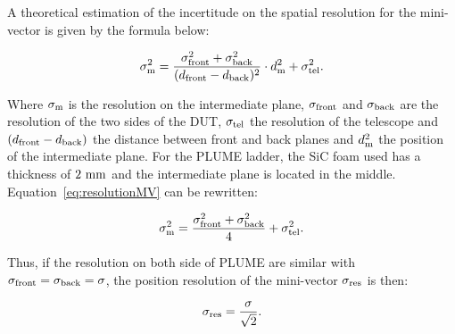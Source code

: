     A theoretical estimation of the incertitude on the spatial resolution for the mini-vector is given by the formula below:

    \begin{equation}
      \sigma_{\rm{m}}^2 = \frac{\sigma_{\rm{front}}^2 + \sigma_{\rm{back}}^2}{(d_{\rm{front}} - d_{\rm{back}})^2} \cdot d_{\rm{m}}^2 + \sigma_{\rm{tel}}^2.
      \label{eq:resolutionMV}
    \end{equation}

    Where $\sigma_{\rm{m}}$ is the resolution on the intermediate plane, $\sigma_{\rm{front}}$ and $\sigma_{\rm{back}}$ are the resolution of the two sides of the \gls{DUT}, $\sigma_{\rm{tel}}$ the resolution of the telescope and $(d_{\rm{front}} - d_{\rm{back}})$ the distance between front and back planes and $d_{\rm{m}}^2$ the position of the intermediate plane.
    For the \gls{PLUME} ladder, the \gls{SiC} foam used has a thickness of $2~\rm{mm}$ and the intermediate plane is located in the middle.
    Equation~\ref{eq:resolutionMV} can be rewritten:

    \begin{equation}
      \sigma_{\rm{m}}^2 = \frac{\sigma_{\rm{front}}^2 + \sigma_{\rm{back}}^2}{4} + \sigma_{\rm{tel}}^2.
    \end{equation}

    Thus, if the resolution on both side of \gls{PLUME} are similar with $\sigma_{\rm{front}} = \sigma_{\rm{back}} = \sigma$, the position resolution of the mini-vector $\sigma_{\rm{res}}$ is then:

    \begin{equation}
      \sigma_{\rm{res}} = \frac{\sigma}{\sqrt{2}}.
    \end{equation}

